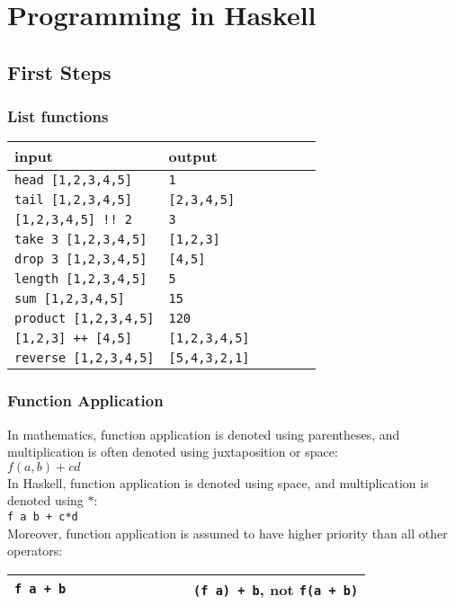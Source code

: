 \section{Programming in Haskell}
\begin{multicols}{2}
\subsection{First Steps}
\subsubsection{List functions}
\begin{tabular}{|p{0.5\linewidth}|p{0.5\linewidth}|}
  \hline
  \textbf{input} & \textbf{output} \\
  \hline
  \lstinline|head [1,2,3,4,5]| & \lstinline|1| \\
  \hline
  \lstinline|tail [1,2,3,4,5]| & \lstinline|[2,3,4,5]| \\
  \hline
  \lstinline|[1,2,3,4,5] !! 2| & \lstinline|3| \\
  \hline
  \lstinline|take 3 [1,2,3,4,5]| & \lstinline|[1,2,3]| \\
  \hline
  \lstinline|drop 3 [1,2,3,4,5]| & \lstinline|[4,5]| \\
  \hline
  \lstinline|length [1,2,3,4,5]| & \lstinline|5| \\
  \hline
  \lstinline|sum [1,2,3,4,5]| & \lstinline|15| \\
  \hline
  \lstinline|product [1,2,3,4,5]| & \lstinline|120| \\
  \hline
  \lstinline|[1,2,3] ++ [4,5]| & \lstinline|[1,2,3,4,5]| \\
  \hline
  \lstinline|reverse [1,2,3,4,5]| & \lstinline|[5,4,3,2,1]| \\
  \hline
\end{tabular}

\subsubsection{Function Application}
In mathematics, function application is denoted using parentheses, and multiplication is often denoted using juxtaposition or space:\\
$f(a,b) + c d$\\
In Haskell, function application is denoted using space, and multiplication is denoted using $*$:\\
\lstinline{f a b + c*d}\\
Moreover, function application is assumed to have higher priority than all other operators:\\
\begin{tabular}{|p{0.5\linewidth}|p{0.5\linewidth}|}
    \hline
    \lstinline|f a + b| & \lstinline|(f a) + b|, \textbf{not} \lstinline|f(a + b)|\\
    \hline
\end{tabular}


\end{multicols}
